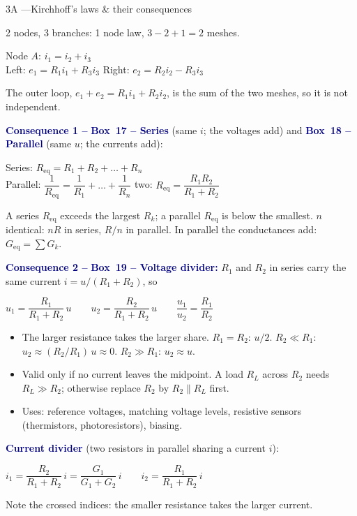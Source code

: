 \documentclass[10pt,a4paper]{article}
\newlength{\colw}
\newenvironment{column}{\begin{minipage}[t]{\colw}\vspace{0pt}}{\end{minipage}}
\newcommand{\Req}{R_{\mathrm{eq}}}
\newcommand{\bx}[2]{\textcolor{navy}{\textbf{Box~#1 -- #2}}}
\newcommand{\hd}[1]{\textcolor{navy}{\textbf{#1}}}
\newcommand{\nxt}{\par\smallskip}
\begin{document}
\begin{column}
\begin{panel}{3A \enspace---\enspace Kirchhoff's laws \& their consequences}
\begin{center}
\end{center}
2 nodes, 3 branches: 1 node law, $3-2+1 = 2$ meshes.
\begin{fml}
  Node $A$: $i_1 = i_2 + i_3$\\[1pt]
  Left: $e_1 = R_1 i_1 + R_3 i_3$ \quad Right: $e_2 = R_2 i_2 - R_3 i_3$
\end{fml}
The outer loop, $e_1 + e_2 = R_1 i_1 + R_2 i_2$, is the sum of the two meshes, so it
is not independent.
\nxt
\hd{Consequence 1 --} \bx{17}{Series} (same $i$; the voltages add) and
\bx{18}{Parallel} (same $u$; the currents add):
\begin{fml}
  Series: $\Req = R_1 + R_2 + \dots + R_n$\\[2pt]
  Parallel: $\dfrac{1}{\Req} = \dfrac{1}{R_1} + \dots + \dfrac{1}{R_n}$ \quad
  two: $\Req = \dfrac{R_1R_2}{R_1 + R_2}$
\end{fml}
A series $\Req$ exceeds the largest $R_k$; a parallel $\Req$ is below the smallest.
$n$ identical: $nR$ in series, $R/n$ in parallel. In parallel the conductances add:
$G_{\mathrm{eq}} = \sum G_k$.
\nxt
\hd{Consequence 2 --} \bx{19}{Voltage divider:} $R_1$ and $R_2$ in series carry the
same current $i = u/(R_1 + R_2)$, so
\begin{fml}
  $u_1 = \dfrac{R_1}{R_1 + R_2}\,u \qquad u_2 = \dfrac{R_2}{R_1 + R_2}\,u \qquad
   \dfrac{u_1}{u_2} = \dfrac{R_1}{R_2}$
\end{fml}
\begin{itemize}
  \item The larger resistance takes the larger share. $R_1 = R_2$: $u/2$.
    $R_2 \ll R_1$: $u_2 \approx (R_2/R_1)\,u \approx 0$. $R_2 \gg R_1$: $u_2 \approx u$.
  \item Valid only if no current leaves the midpoint. A load $R_L$ across $R_2$ needs
    $R_L \gg R_2$; otherwise replace $R_2$ by $R_2 \parallel R_L$ first.
  \item Uses: reference voltages, matching voltage levels, resistive sensors
    (thermistors, photoresistors), biasing.
\end{itemize}
\hd{Current divider} (two resistors in parallel sharing a current $i$):
\begin{fml}
  $i_1 = \dfrac{R_2}{R_1 + R_2}\,i = \dfrac{G_1}{G_1 + G_2}\,i \qquad
   i_2 = \dfrac{R_1}{R_1 + R_2}\,i$
\end{fml}
Note the crossed indices: the smaller resistance takes the larger current.
\end{panel}
\end{column}\hfill
\end{document}
